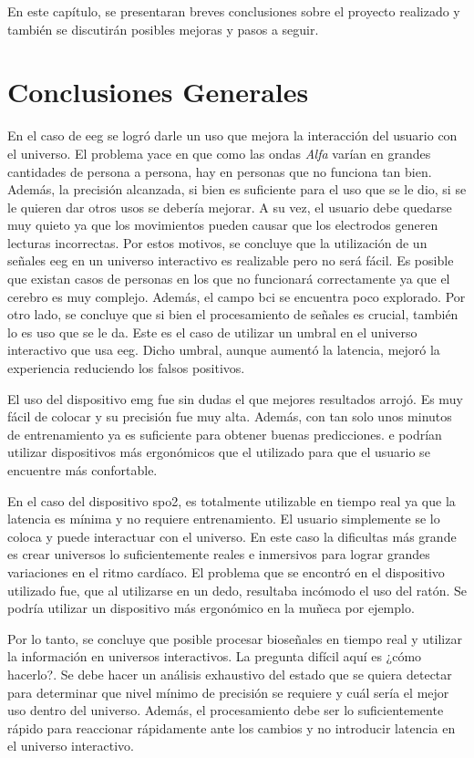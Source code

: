 En este capítulo, se presentaran breves conclusiones sobre el proyecto realizado y también se discutirán posibles mejoras y pasos a seguir.

\section{Conclusiones Generales}

En el caso de \acrshort{eeg} se logró darle un uso que mejora la interacción del usuario con el universo. El problema yace en que como las ondas \emph{Alfa} varían en grandes cantidades de persona a persona, hay en personas que no funciona tan bien. Además, la precisión alcanzada, si bien es suficiente para el uso que se le dio, si se le quieren dar otros usos se debería mejorar. A su vez, el usuario debe quedarse muy quieto ya que los movimientos pueden causar que los electrodos generen lecturas incorrectas. Por estos motivos, se concluye que la utilización de un señales \acrshort{eeg} en un universo interactivo es realizable pero no será fácil. Es posible que existan casos de personas en los que no funcionará correctamente ya que el cerebro es muy complejo. Además, el campo \acrshort{bci} se encuentra poco explorado. Por otro lado, se concluye que si bien el procesamiento de señales es crucial, también lo es uso que se le da. Este es el caso de utilizar un umbral en el universo interactivo que usa \acrshort{eeg}. Dicho umbral, aunque aumentó la latencia, mejoró la experiencia reduciendo los falsos positivos.

El uso del dispositivo \acrshort{emg} fue sin dudas el que mejores resultados arrojó. Es muy fácil de colocar y su precisión fue muy alta. Además, con tan solo unos minutos de entrenamiento ya es suficiente para obtener buenas predicciones. e podrían utilizar dispositivos más ergonómicos que el utilizado para que el usuario se encuentre más confortable.

En el caso del dispositivo \acrshort{spo2}, es totalmente utilizable en tiempo real ya que la latencia es mínima y no requiere entrenamiento. El usuario simplemente se lo coloca y puede interactuar con el universo. En este caso la dificultas más grande es crear universos lo suficientemente reales e inmersivos para lograr grandes variaciones en el ritmo cardíaco. El problema que se encontró en el dispositivo utilizado fue, que al utilizarse en un dedo, resultaba incómodo el uso del ratón. Se podría utilizar un dispositivo más ergonómico en la muñeca por ejemplo.

Por lo tanto, se concluye que posible procesar bioseñales en tiempo real y utilizar la información en universos interactivos. La pregunta difícil aquí es ¿cómo hacerlo?. Se debe hacer un análisis exhaustivo del estado que se quiera detectar para determinar que nivel mínimo de precisión se requiere y cuál sería el mejor uso dentro del universo. Además, el procesamiento debe ser lo suficientemente rápido para reaccionar rápidamente ante los cambios y no introducir latencia en el universo interactivo.

